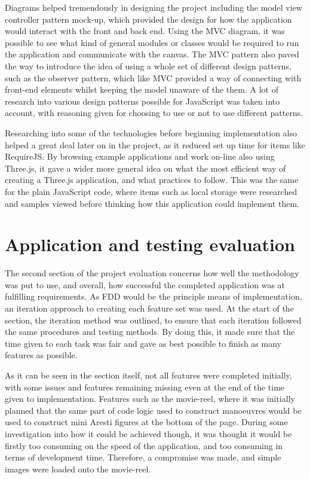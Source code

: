 Diagrams helped tremendously in designing the project including the model view controller pattern mock-up, which provided the design for how the application would interact with the front and back end. Using the MVC diagram, it was possible to see what kind of general modules or classes would be required to run the application and communicate with the canvas. The MVC pattern also paved the way to introduce the idea of using a whole set of different design patterns, such as the observer pattern, which like MVC provided a way of connecting with front-end elements whilst keeping the model unaware of the them. A lot of research into various design patterns possible for JavaScript was taken into account, with reasoning given for choosing to use or not to use different patterns.

Researching into some of the technologies before beginning implementation also helped a great deal later on in the project, as it reduced set up time for items like RequireJS. By browsing example applications and work on-line also using Three.js, it gave a wider more general idea on what the most efficient way of creating a Three.js application, and what practices to follow. This was the same for the plain JavaScript code, where items such as local storage were researched and samples viewed before thinking how this application could implement them.

\section{Application and testing evaluation}
The second section of the project evaluation concerns how well the methodology was put to use, and overall, how successful the completed application was at fulfilling requirements. As FDD would be the principle means of implementation, an iteration approach to creating each feature set was used. At the start of the section, the iteration method was outlined, to ensure that each iteration followed the same procedures and testing methods. By doing this, it made sure that the time given to each task was fair and gave as best possible to finish as many features as possible.

As it can be seen in the section itself, not all features were completed initially, with some issues and features remaining missing even at the end of the time given to implementation. Features such as the movie-reel, where it was initially planned that the same part of code logic used to construct manoeuvres would be used to construct mini Aresti figures at the bottom of the page. During some investigation into how it could be achieved though, it was thought it would be firstly too consuming on the speed of the application, and too consuming in terms of development time. Therefore, a compromise was made, and simple images were loaded onto the movie-reel.

